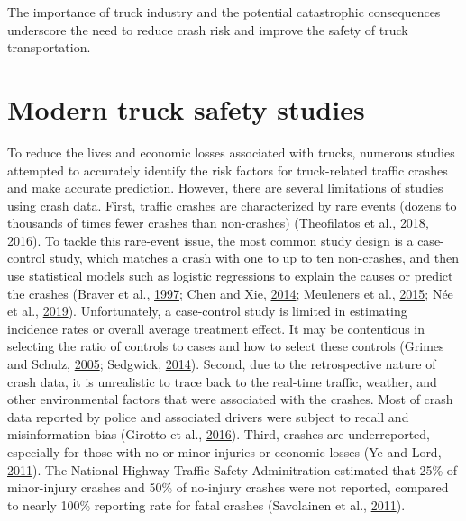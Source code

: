 \documentclass[12pt]{book}
\numberwithin{equation}{chapter}
\begin{document}
The importance of truck industry and the potential catastrophic consequences underscore the need to reduce crash risk and improve the safety of truck transportation.

\hypertarget{modern-truck-safety-studies}{%
\section{Modern truck safety studies}\label{modern-truck-safety-studies}}

To reduce the lives and economic losses associated with trucks, numerous studies attempted to accurately identify the risk factors for truck-related traffic crashes and make accurate prediction. However, there are several limitations of studies using crash data. First, traffic crashes are characterized by rare events (dozens to thousands of times fewer crashes than non-crashes) (Theofilatos et al., \protect\hyperlink{ref-theofilatos2018impact}{2018}, \protect\hyperlink{ref-theofilatos2016predicting}{2016}). To tackle this rare-event issue, the most common study design is a case-control study, which matches a crash with one to up to ten non-crashes, and then use statistical models such as logistic regressions to explain the causes or predict the crashes (Braver et al., \protect\hyperlink{ref-braver1997tractor}{1997}; Chen and Xie, \protect\hyperlink{ref-chen2014modeling}{2014}; Meuleners et al., \protect\hyperlink{ref-meuleners2015obstructive}{2015}; Née et al., \protect\hyperlink{ref-nee2019road}{2019}). Unfortunately, a case-control study is limited in estimating incidence rates or overall average treatment effect. It may be contentious in selecting the ratio of controls to cases and how to select these controls (Grimes and Schulz, \protect\hyperlink{ref-grimes2005compared}{2005}; Sedgwick, \protect\hyperlink{ref-sedgwick2014case}{2014}). Second, due to the retrospective nature of crash data, it is unrealistic to trace back to the real-time traffic, weather, and other environmental factors that were associated with the crashes. Most of crash data reported by police and associated drivers were subject to recall and misinformation bias (Girotto et al., \protect\hyperlink{ref-girotto2016professional}{2016}). Third, crashes are underreported, especially for those with no or minor injuries or economic losses (Ye and Lord, \protect\hyperlink{ref-ye2011investigation}{2011}). The National Highway Traffic Safety Adminitration estimated that 25\% of minor-injury crashes and 50\% of no-injury crashes were not reported, compared to nearly 100\% reporting rate for fatal crashes (Savolainen et al., \protect\hyperlink{ref-savolainen2011statistical}{2011}).
\end{document}
